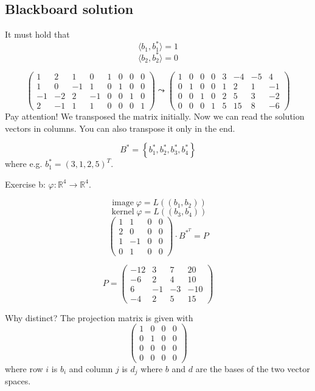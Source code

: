 \documentclass[a4paper]{article}
\theoremstyle{definition}
\DeclareMathOperator\kernel{kernel}
\DeclareMathOperator\image{image}
\newcommand\set[1]{\left\{#1\right\}}
\newcommand\angel[1]{\langle#1\rangle}
\begin{document}
\subsection{Blackboard solution}

It must hold that
\[ \angel{b_1, b_1^*} = 1 \]
\[ \angel{b_2, b_2^*} = 0 \]


\[
  \begin{pmatrix}
    1 & 2 & 1 & 0     & 1 & 0 & 0 & 0 \\
    1 & 0 & -1 & 1    & 0 & 1 & 0 & 0 \\
    -1 & -2 & 2 & -1  & 0 & 0 & 1 & 0 \\
    2 & -1 & 1 & 1    & 0 & 0 & 0 & 1
  \end{pmatrix}
  \leadsto
  \begin{pmatrix}
    1 & 0 & 0 & 0 &  3 & -4 & -5 & 4 \\
    0 & 1 & 0 & 0 &  1 & 2 & 1 & -1 \\
    0 & 0 & 1 & 0 &  2 & 5 & 3 & -2 \\
    0 & 0 & 0 & 1 &  5 & 15 & 8 & -6
  \end{pmatrix}
\]
Pay attention! We transposed the matrix initially.
Now we can read the solution vectors in columns.
You can also transpose it only in the end.

\[ B^* = \set{b_1^*, b_2^*, b_3^*, b_4^*} \]
where e.g. $b_1^* = (3, 1, 2, 5)^T$.

Exercise b: $\varphi: \mathbb R^4 \to \mathbb R^4$.

\[ \image{\varphi} = L((b_1, b_2)) \]
\[ \kernel{\varphi} = L((b_3, b_4)) \]
\[
  \begin{pmatrix}
    1 & 1 & 0 & 0 \\
    2 & 0 & 0 & 0 \\
    1 & -1 & 0 & 0 \\
    0 & 1 & 0 & 0
  \end{pmatrix}
  \cdot B^{{*}^T} = P
\]

\[
  P = \begin{pmatrix}
    -12 & 3 & 7 & 20 \\
    -6 & 2 & 4 & 10 \\
    6 & -1 & -3 & -10 \\
    -4 & 2 & 5 & 15
  \end{pmatrix}
\]

Why distinct?
The projection matrix is given with
\[
  \begin{pmatrix} 1 & 0 & 0 & 0 \\ 0 & 1 & 0 & 0 \\ 0 & 0 & 0 & 0 \\ 0 & 0 & 0 & 0 \end{pmatrix}
\]
where row $i$ is $b_i$ and column $j$ is $d_j$ where $b$ and $d$ are the bases of the two vector spaces.
\end{document}
